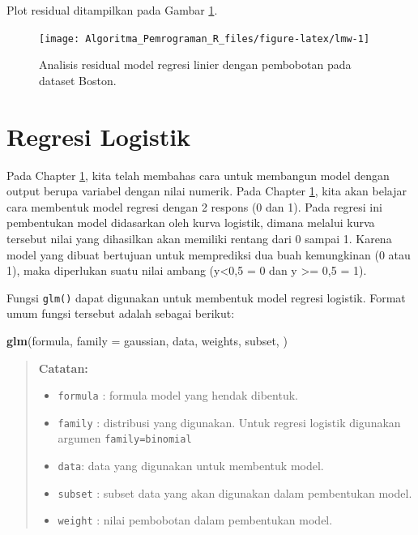 \documentclass[
]{book}
\newenvironment{Shaded}{\begin{snugshade}}{\end{snugshade}}
\newcommand{\AttributeTok}[1]{\textcolor[rgb]{0.13,0.29,0.53}{#1}}
\newcommand{\FunctionTok}[1]{\textcolor[rgb]{0.13,0.29,0.53}{\textbf{#1}}}
\newcommand{\NormalTok}[1]{#1}
\providecommand{\tightlist}{%
  \setlength{\itemsep}{0pt}\setlength{\parskip}{0pt}}
\theoremstyle{definition}
\theoremstyle{definition}
\theoremstyle{definition}
\theoremstyle{definition}
\theoremstyle{remark}
\begin{document}
Plot residual ditampilkan pada Gambar \ref{fig:lmw}.

\begin{figure}

{\centering \texttt{[image: Algoritma\_Pemrograman\_R\_files/figure-latex/lmw-1]} 

}

\caption{Analisis residual model regresi linier dengan pembobotan pada dataset Boston.}\label{fig:lmw}
\end{figure}

\hypertarget{logreg}{%
\section{Regresi Logistik}\label{logreg}}

Pada Chapter \ref{logreg}, kita telah membahas cara untuk membangun model dengan output berupa variabel dengan nilai numerik. Pada Chapter \ref{logreg}, kita akan belajar cara membentuk model regresi dengan 2 respons (0 dan 1). Pada regresi ini pembentukan model didasarkan oleh kurva logistik, dimana melalui kurva tersebut nilai yang dihasilkan akan memiliki rentang dari 0 sampai 1. Karena model yang dibuat bertujuan untuk memprediksi dua buah kemungkinan (0 atau 1), maka diperlukan suatu nilai ambang (y\textless0,5 = 0 dan y \textgreater= 0,5 = 1).

Fungsi \texttt{glm()} dapat digunakan untuk membentuk model regresi logistik. Format umum fungsi tersebut adalah sebagai berikut:

\begin{Shaded}
\begin{Highlighting}[]
\FunctionTok{glm}\NormalTok{(formula, }\AttributeTok{family =}\NormalTok{ gaussian, data, weights, subset,}
\NormalTok{    )}
\end{Highlighting}
\end{Shaded}

\begin{quote}
\textbf{Catatan:}

\begin{itemize}
\tightlist
\item
  \texttt{formula} : formula model yang hendak dibentuk.
\item
  \texttt{family} : distribusi yang digunakan. Untuk regresi logistik digunakan argumen \texttt{family=binomial}
\item
  \texttt{data}: data yang digunakan untuk membentuk model.
\item
  \texttt{subset} : subset data yang akan digunakan dalam pembentukan model.
\item
  \texttt{weight} : nilai pembobotan dalam pembentukan model.
\end{itemize}
\end{quote}
\end{document}
